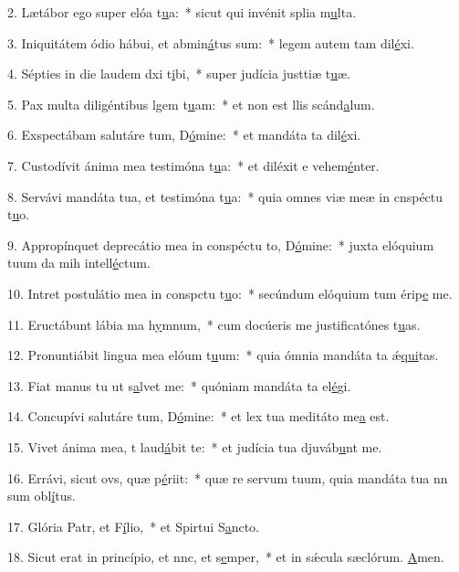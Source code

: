 2. Lætábor ego super elóa t\uline{u}a:~* sicut qui invénit splia m\uline{u}lta.\par 
3. Iniquitátem ódio hábui, et abmin\uline{á}tus sum:~* legem autem tam dil\uline{é}xi.\par 
4. Sépties in die laudem dxi t\uline{i}bi,~* super judícia justtiæ t\uline{u}æ.\par 
5. Pax multa diligéntibus lgem t\uline{u}am:~* et non est llis scánd\uline{a}lum.\par 
6. Exspectábam salutáre tum, D\uline{ó}mine:~* et mandáta ta dil\uline{é}xi.\par 
7. Custodívit ánima mea testimóna t\uline{u}a:~* et diléxit e vehem\uline{é}nter.\par 
8. Servávi mandáta tua, et testimóna t\uline{u}a:~* quia omnes viæ meæ in cnspéctu t\uline{u}o.\par 
9. Appropínquet deprecátio mea in conspéctu to, D\uline{ó}mine:~* juxta elóquium tuum da mih intell\uline{é}ctum.\par 
10. Intret postulátio mea in conspctu t\uline{u}o:~* secúndum elóquium tum érip\uline{e} me.\par 
11. Eructábunt lábia ma h\uline{y}mnum,~* cum docúeris me justificatónes t\uline{u}as.\par 
12. Pronuntiábit lingua mea elóum t\uline{u}um:~* quia ómnia mandáta ta ǽ\uline{qui}tas.\par 
13. Fiat manus tu ut s\uline{a}lvet me:~* quóniam mandáta ta el\uline{é}gi.\par 
14. Concupívi salutáre tum, D\uline{ó}mine:~* et lex tua meditáto me\uline{a} est.\par 
15. Vivet ánima mea, t laud\uline{á}bit te:~* et judícia tua djuváb\uline{u}nt me.\par 
16. Errávi, sicut ovs, quæ p\uline{é}riit:~* quæ re servum tuum, quia mandáta tua nn sum obl\uline{í}tus.\par 
17. Glória Patr, et F\uline{í}lio,~* et Spirtui S\uline{a}ncto.\par 
18. Sicut erat in princípio, et nnc, et s\uline{e}mper,~* et in sǽcula sæclórum. \uline{A}men.\par 
